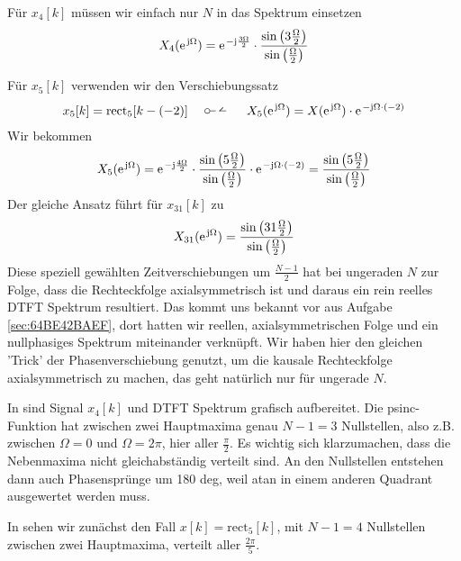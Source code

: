 \begin{Loesung}
Für $x_4[k]$ müssen wir einfach nur $N$ in das Spektrum einsetzen
\begin{equation}
X_4(\e^{\im\Omega})=\e^{-\im\frac{3\Omega}{2}}\cdot\frac{\sin\left(3\frac{\Omega}{2}\right)}{\sin\left(\frac{\Omega}{2}\right)}
\end{equation}

Für $x_5[k]$ verwenden wir den Verschiebungssatz
\begin{align}
x_5[k] = \mathrm{rect}_5[k-(-2)] \quad\dtft\quad X_5(\e^{\im\Omega}) = X(\e^{\im\Omega}) \cdot \e^{-\im\Omega\cdot (-2)}
\end{align}
Wir bekommen
\begin{equation}
X_5(\e^{\im\Omega})
=\e^{-\im\frac{4\Omega}{2}}\cdot\frac{\sin\left(5\frac{\Omega}{2}\right)}{\sin\left(\frac{\Omega}{2}\right)}  \cdot \e^{-\im\Omega\cdot (-2)}=
\frac{\sin\left(5\frac{\Omega}{2}\right)}{\sin\left(\frac{\Omega}{2}\right)}
\end{equation}
Der gleiche Ansatz führt für $x_{31}[k]$ zu
\begin{equation}
X_{31}(\e^{\im\Omega}) = \frac{\sin\left(31\frac{\Omega}{2}\right)}{\sin\left(\frac{\Omega}{2}\right)}
\end{equation}
%
Diese speziell gewählten Zeitverschiebungen um $\frac{N-1}{2}$ hat bei ungeraden
$N$ zur Folge, dass die Rechteckfolge axialsymmetrisch ist und daraus
ein rein reelles DTFT Spektrum resultiert. Das kommt uns bekannt vor aus
Aufgabe \ref{sec:64BE42BAEF}, dort hatten wir
reellen, axialsymmetrischen Folge und ein nullphasiges Spektrum miteinander
verknüpft. Wir haben hier den gleichen 'Trick' der Phasenverschiebung genutzt,
um die kausale Rechteckfolge axialsymmetrisch zu machen, das geht natürlich
nur für ungerade $N$.
%

In  sind Signal $x_4[k]$ und DTFT
Spektrum grafisch aufbereitet. Die psinc-Funktion hat zwischen zwei Hauptmaxima
genau $N-1=3$ Nullstellen, also z.B. zwischen $\Omega=0$ und $\Omega=2\pi$,
hier aller $\frac{\pi}{2}$. Es wichtig sich klarzumachen, dass die Nebenmaxima
nicht gleichabständig verteilt sind.
%
An den Nullstellen entstehen dann auch Phasensprünge um 180 deg, weil
atan in einem anderen Quadrant ausgewertet werden muss.

In  sehen wir zunächst den Fall
$x[k] = \mathrm{rect}_5[k]$, mit $N-1=4$ Nullstellen zwischen zwei Hauptmaxima,
verteilt aller $\frac{2\pi}{5}$.


\end{Loesung}
